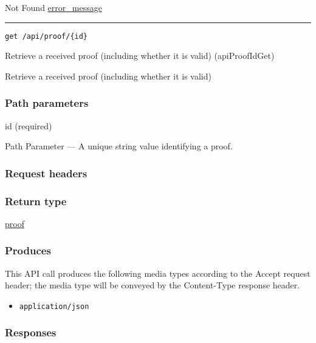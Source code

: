 Not Found \protect\hyperlink{error_message}{error\_message}

\begin{center}\rule{0.5\linewidth}{\linethickness}\end{center}

\protect\hypertarget{apiProofIdGet}{}{}

\begin{verbatim}
get /api/proof/{id}
\end{verbatim}

Retrieve a received proof (including whether it is valid)
({apiProofIdGet})

Retrieve a received proof (including whether it is valid)

\hypertarget{path-parameters-50}{%
\subsubsection{Path parameters}\label{path-parameters-50}}

id (required)

{Path Parameter} --- A unique string value identifying a proof.

\hypertarget{request-headers-52}{%
\subsubsection{Request headers}\label{request-headers-52}}

\hypertarget{return-type-76}{%
\subsubsection{Return type}\label{return-type-76}}

\protect\hyperlink{proof}{proof}

\hypertarget{produces-96}{%
\subsubsection{Produces}\label{produces-96}}

This API call produces the following media types according to the
{Accept} request header; the media type will be conveyed by the
{Content-Type} response header.

\begin{itemize}
\tightlist
\item
  \texttt{application/json}
\end{itemize}

\hypertarget{responses-98}{%
\subsubsection{Responses}\label{responses-98}}

